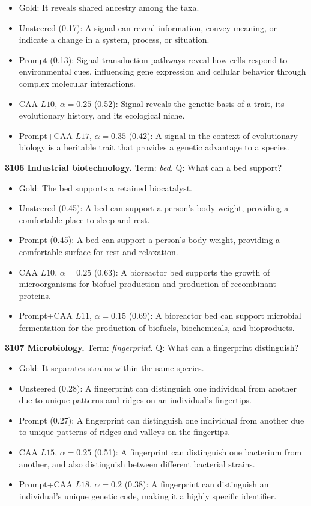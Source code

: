 \begin{itemize}\setlength{\itemsep}{0.15em}\setlength{\parsep}{0pt}\setlength{\topsep}{0.2em}
\item Gold: It reveals shared ancestry among the taxa.
\item Unsteered (0.17): A signal can reveal information, convey meaning, or indicate a change in a system, process, or situation.
\item Prompt (0.13): Signal transduction pathways reveal how cells respond to environmental cues, influencing gene expression and cellular behavior through complex molecular interactions.
\item CAA $L10$, $\alpha=0.25$ (0.52): Signal reveals the genetic basis of a trait, its evolutionary history, and its ecological niche.
\item Prompt+CAA $L17$, $\alpha=0.35$ (0.42): A signal in the context of evolutionary biology is a heritable trait that provides a genetic advantage to a species.
\end{itemize}
\medskip\noindent\textbf{3106 Industrial biotechnology.} Term: \emph{bed}.
Q: What can a bed support?
\begin{itemize}\setlength{\itemsep}{0.15em}\setlength{\parsep}{0pt}\setlength{\topsep}{0.2em}
\item Gold: The bed supports a retained biocatalyst.
\item Unsteered (0.45): A bed can support a person's body weight, providing a comfortable place to sleep and rest.
\item Prompt (0.45): A bed can support a person's body weight, providing a comfortable surface for rest and relaxation.
\item CAA $L10$, $\alpha=0.25$ (0.63): A bioreactor bed supports the growth of microorganisms for biofuel production and production of recombinant proteins.
\item Prompt+CAA $L11$, $\alpha=0.15$ (0.69): A bioreactor bed can support microbial fermentation for the production of biofuels, biochemicals, and bioproducts.
\end{itemize}
\medskip\noindent\textbf{3107 Microbiology.} Term: \emph{fingerprint}.
Q: What can a fingerprint distinguish?
\begin{itemize}\setlength{\itemsep}{0.15em}\setlength{\parsep}{0pt}\setlength{\topsep}{0.2em}
\item Gold: It separates strains within the same species.
\item Unsteered (0.28): A fingerprint can distinguish one individual from another due to unique patterns and ridges on an individual's fingertips.
\item Prompt (0.27): A fingerprint can distinguish one individual from another due to unique patterns of ridges and valleys on the fingertips.
\item CAA $L15$, $\alpha=0.25$ (0.51): A fingerprint can distinguish one bacterium from another, and also distinguish between different bacterial strains.
\item Prompt+CAA $L18$, $\alpha=0.2$ (0.38): A fingerprint can distinguish an individual's unique genetic code, making it a highly specific identifier.
\end{itemize}
